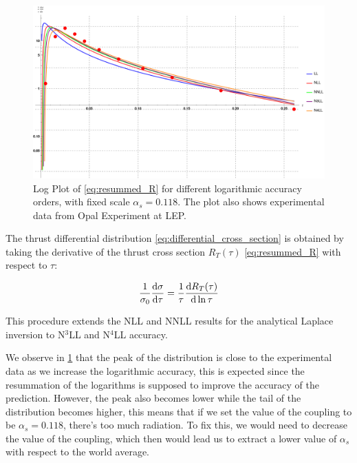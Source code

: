 \documentclass[../main.tex]{subfiles}
\begin{document}
\begin{figure}[htbp]
    \centering
    \includegraphics[width=\textwidth]{figures/Thrust_differential_distribution.png}
    \caption{Log Plot of \cref{eq:resummed_R} for different logarithmic accuracy orders, with fixed scale $\alpha_s = 0.118$. 
    The plot also shows experimental data from Opal Experiment at LEP.}
    \label{fig:Thrust distribution with data}
\end{figure}

The thrust differential distribution \cref{eq:differential_cross_section} is obtained by taking the derivative of the thrust cross section 
$R_T(\tau)$ \cref{eq:resummed_R} with respect to $\tau$:

\begin{equation}
    \frac{1}{\sigma_0} \dv{\sigma}{\tau} = \frac{1}{\tau} \dv{R_T(\tau)}{\ln \tau} 
\end{equation}

This procedure extends the NLL \cite{CATANI19933} and NNLL \cite{Monni:2011gb} results for the analytical Laplace inversion to N$^3$LL and N$^4$LL accuracy.

We observe in \cref{fig:Thrust distribution with data} that the peak of the distribution is close to the experimental data as we increase the logarithmic accuracy,
this is expected since the resummation of the logarithms is supposed to improve the accuracy of the prediction.
However, the peak also becomes lower while the tail of the distribution becomes higher, this means that if we set the value of the coupling to be $\alpha_s=0.118$, there's 
too much radiation. To fix this, we would need to decrease the value of the coupling, which then would lead us to extract a lower value of $\alpha_s$ with respect to the world average. 
\end{document}
